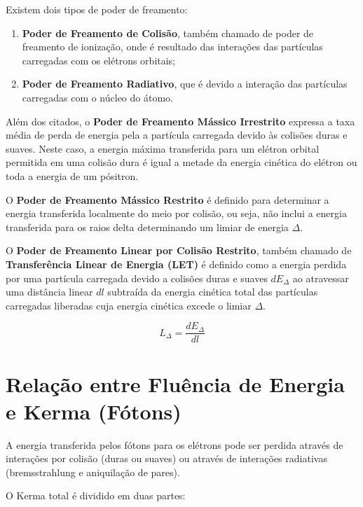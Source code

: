 \documentclass[11pt,a4paper]{article}
\begin{document}
		Existem dois tipos de poder de freamento:

		\begin{enumerate}
			\item \textbf{Poder de Freamento de Colisão}, também chamado de poder de freamento de ionização, onde é resultado das interações das partículas carregadas com os elétrons orbitais;
			\item \textbf{Poder de Freamento Radiativo}, que é devido a interação das partículas carregadas com o núcleo do átomo.
		\end{enumerate}

		Além dos citados, o \textbf{Poder de Freamento Mássico Irrestrito} expressa a taxa média de perda de energia pela a partícula carregada devido às colisões duras e suaves. Neste caso, a energia máxima transferida para um elétron orbital permitida em uma colisão dura é igual a metade da energia cinética do elétron ou toda a energia de um pósitron. 


		O \textbf{Poder de Freamento Mássico Restrito} é definido para determinar a energia transferida localmente do meio por colisão, ou seja, não inclui a energia transferida para os raios delta determinando um limiar de energia $\Delta$.

		O \textbf{Poder de Freamento Linear por Colisão Restrito}, também chamado de \textbf{Transferência Linear de Energia (LET)} é definido como a energia perdida por uma partícula carregada devido a colisões duras e suaves $dE_\Delta$ ao atravessar uma distância linear $dl$ subtraída da energia cinética total das partículas carregadas liberadas cuja energia cinética excede o limiar $\Delta$.

			\begin{equation}
				L_\Delta = \frac{dE_\Delta}{dl}
			\end{equation}
	
		
	\section{Relação entre Fluência de Energia e Kerma (Fótons)}

		A energia transferida pelos fótons para os elétrons pode ser perdida através de interações por colisão (duras ou suaves) ou através de interações radiativas (bremsstrahlung e aniquilação de pares). 
		
		O Kerma total é dividido em duas partes:
\end{document}
